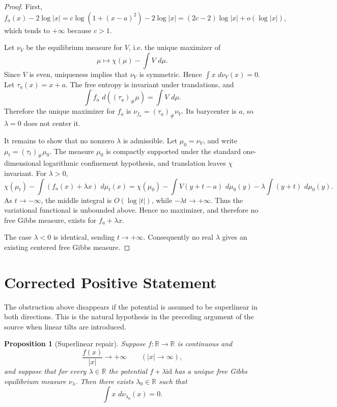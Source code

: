 \documentclass[11pt]{article}
\newtheorem{proposition}{Proposition}
\newcommand{\R}{\mathbb{R}}
\newcommand{\dd}{\,d}
\newcommand{\id}{\mathrm{id}}
\begin{document}
\begin{proof}
First,
\[
f_a(x)-2\log |x|
=c\log(1+(x-a)^2)-2\log |x|
=(2c-2)\log |x|+o(\log |x|),
\]
which tends to \(+\infty\) because \(c>1\).

Let \(\nu_V\) be the equilibrium measure for \(V\), i.e. the unique maximizer
of
\[
        \mu\mapsto \chi(\mu)-\int V\,\dd\mu .
\]
Since \(V\) is even, uniqueness implies that \(\nu_V\) is symmetric. Hence
\(\int x\,\dd\nu_V(x)=0\). Let \(\tau_a(x)=x+a\). The free entropy is invariant
under translations, and
\[
        \int f_a\,\dd((\tau_a)_\#\mu)
        =\int V\,\dd\mu .
\]
Therefore the unique maximizer for \(f_a\) is
\(\nu_{f_a}=(\tau_a)_\#\nu_V\). Its barycenter is \(a\), so \(\lambda=0\) does
not center it.

It remains to show that no nonzero \(\lambda\) is admissible. Let
\(\mu_0=\nu_V\), and write \(\mu_t=(\tau_t)_\#\mu_0\). The measure \(\mu_0\) is
compactly supported under the standard one-dimensional logarithmic confinement
hypothesis, and translation leaves \(\chi\) invariant. For \(\lambda>0\),
\[
\chi(\mu_t)-\int (f_a(x)+\lambda x)\,\dd\mu_t(x)
=\chi(\mu_0)-\int V(y+t-a)\,\dd\mu_0(y)-\lambda\int(y+t)\,\dd\mu_0(y).
\]
As \(t\to-\infty\), the middle integral is \(O(\log |t|)\), while
\(-\lambda t\to+\infty\). Thus the variational functional is unbounded above.
Hence no maximizer, and therefore no free Gibbs measure, exists for
\(f_a+\lambda x\).

The case \(\lambda<0\) is identical, sending \(t\to+\infty\). Consequently no
real \(\lambda\) gives an existing centered free Gibbs measure.
\end{proof}

\section*{Corrected Positive Statement}

The obstruction above disappears if the potential is assumed to be
superlinear in both directions. This is the natural hypothesis in the preceding
argument of the source when linear tilts are introduced.

\begin{proposition}[Superlinear repair]
Suppose \(f:\R\to\R\) is continuous and
\[
        \frac{f(x)}{|x|}\longrightarrow+\infty\qquad (|x|\to\infty),
\]
and suppose that for every \(\lambda\in\R\) the potential
\(f+\lambda\id\) has a unique free Gibbs equilibrium measure \(\nu_\lambda\).
Then there exists \(\lambda_0\in\R\) such that
\[
        \int x\,\dd\nu_{\lambda_0}(x)=0.
\]
\end{proposition}
\end{document}
